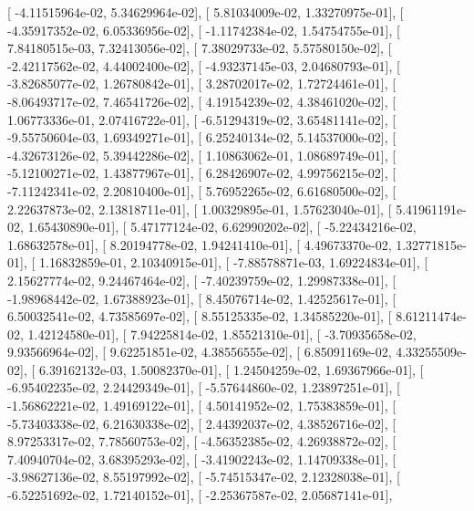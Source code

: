 \documentclass{article}
\begin{document}
       [ -4.11515964e-02,   5.34629964e-02],
       [  5.81034009e-02,   1.33270975e-01],
       [ -4.35917352e-02,   6.05336956e-02],
       [ -1.11742384e-02,   1.54754755e-01],
       [  7.84180515e-03,   7.32413056e-02],
       [  7.38029733e-02,   5.57580150e-02],
       [ -2.42117562e-02,   4.44002400e-02],
       [ -4.93237145e-03,   2.04680793e-01],
       [ -3.82685077e-02,   1.26780842e-01],
       [  3.28702017e-02,   1.72724461e-01],
       [ -8.06493717e-02,   7.46541726e-02],
       [  4.19154239e-02,   4.38461020e-02],
       [  1.06773336e-01,   2.07416722e-01],
       [ -6.51294319e-02,   3.65481141e-02],
       [ -9.55750604e-03,   1.69349271e-01],
       [  6.25240134e-02,   5.14537000e-02],
       [ -4.32673126e-02,   5.39442286e-02],
       [  1.10863062e-01,   1.08689749e-01],
       [ -5.12100271e-02,   1.43877967e-01],
       [  6.28426907e-02,   4.99756215e-02],
       [ -7.11242341e-02,   2.20810400e-01],
       [  5.76952265e-02,   6.61680500e-02],
       [  2.22637873e-02,   2.13818711e-01],
       [  1.00329895e-01,   1.57623040e-01],
       [  5.41961191e-02,   1.65430890e-01],
       [  5.47177124e-02,   6.62990202e-02],
       [ -5.22434216e-02,   1.68632578e-01],
       [  8.20194778e-02,   1.94241410e-01],
       [  4.49673370e-02,   1.32771815e-01],
       [  1.16832859e-01,   2.10340915e-01],
       [ -7.88578871e-03,   1.69224834e-01],
       [  2.15627774e-02,   9.24467464e-02],
       [ -7.40239759e-02,   1.29987338e-01],
       [ -1.98968442e-02,   1.67388923e-01],
       [  8.45076714e-02,   1.42525617e-01],
       [  6.50032541e-02,   4.73585697e-02],
       [  8.55125335e-02,   1.34585220e-01],
       [  8.61211474e-02,   1.42124580e-01],
       [  7.94225814e-02,   1.85521310e-01],
       [ -3.70935658e-02,   9.93566964e-02],
       [  9.62251851e-02,   4.38556555e-02],
       [  6.85091169e-02,   4.33255509e-02],
       [  6.39162132e-03,   1.50082370e-01],
       [  1.24504259e-02,   1.69367966e-01],
       [ -6.95402235e-02,   2.24429349e-01],
       [ -5.57644860e-02,   1.23897251e-01],
       [ -1.56862221e-02,   1.49169122e-01],
       [  4.50141952e-02,   1.75383859e-01],
       [ -5.73403338e-02,   6.21630338e-02],
       [  2.44392037e-02,   4.38526716e-02],
       [  8.97253317e-02,   7.78560753e-02],
       [ -4.56352385e-02,   4.26938872e-02],
       [  7.40940704e-02,   3.68395293e-02],
       [ -3.41902243e-02,   1.14709338e-01],
       [ -3.98627136e-02,   8.55197992e-02],
       [ -5.74515347e-02,   2.12328038e-01],
       [ -6.52251692e-02,   1.72140152e-01],
       [ -2.25367587e-02,   2.05687141e-01],
\end{document}
